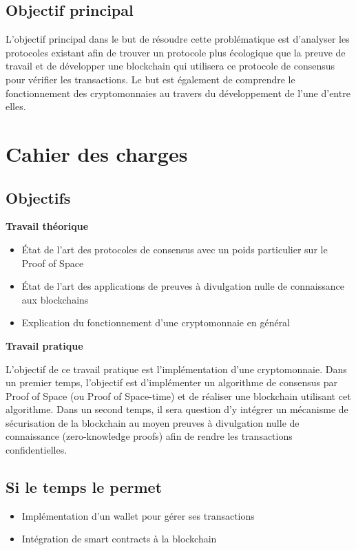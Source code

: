 \subsection*{Objectif principal}

L'objectif principal dans le but de résoudre cette problématique est d'analyser les protocoles existant afin de trouver un protocole plus écologique que la preuve de travail et de développer une blockchain qui utilisera ce protocole de consensus pour vérifier les transactions. Le but est également de comprendre le fonctionnement des cryptomonnaies au travers du développement de l'une d'entre elles.

\section*{Cahier des charges}

\subsection*{Objectifs}

\textbf{Travail théorique}
\begin{itemize}
    \item État de l'art des protocoles de consensus avec un poids particulier sur le Proof of Space
    \item État de l'art des applications de preuves à divulgation nulle de connaissance aux blockchains
    \item Explication du fonctionnement d'une cryptomonnaie en général
\end{itemize}

\textbf{Travail pratique}

L'objectif de ce travail pratique est l'implémentation d'une cryptomonnaie.
Dans un premier temps, l'objectif est d'implémenter un algorithme de consensus par Proof of Space (ou Proof of Space-time) et de réaliser une blockchain utilisant cet algorithme.
Dans un second temps, il sera question d'y intégrer un mécanisme de sécurisation de la blockchain au moyen preuves à divulgation nulle de connaissance (zero-knowledge proofs) afin de rendre les transactions confidentielles.

\subsection*{Si le temps le permet}

\begin{itemize}
    \item Implémentation d'un wallet pour gérer ses transactions
    \item Intégration de smart contracts à la blockchain
\end{itemize}

